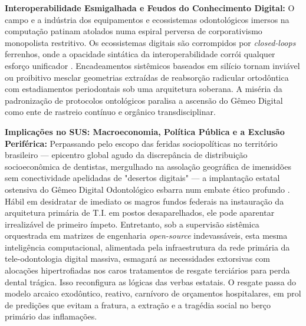 \textbf{Interoperabilidade Esmigalhada e Feudos do Conhecimento Digital:} O campo e a indústria dos equipamentos e ecossistemas odontológicos imersos na computação patinam atolados numa espiral perversa de corporativismo monopolista restritivo. Os ecossistemas digitais são corrompidos por \textit{closed-loops} ferrenhos, onde a opacidade sintática da interoperabilidade corrói qualquer esforço unificador \cite{robles2023opentwins}. Encadeamentos sistêmicos baseados em silício tornam inviável ou proibitivo mesclar geometrias extraídas de reabsorção radicular ortodôntica com estadiamentos periodontais sob uma arquitetura soberana. A miséria da padronização de protocolos ontológicos paralisa a ascensão do Gêmeo Digital como ente de rastreio contínuo e orgânico transdisciplinar. 


\textbf{Implicações no SUS: Macroeconomia, Política Pública e a Exclusão Periférica:} Perpassando pelo escopo das feridas sociopolíticas no território brasileiro --- epicentro global agudo da discrepância de distribuição socioeconômica de dentistas, mergulhado na assolação geográfica de imensidões sem conectividade apelidadas de "desertos digitais" \cite{cuadros2023assessing} --- a implantação estatal ostensiva do Gêmeo Digital Odontológico esbarra num embate ético profundo \cite{frota2025sus}. Hábil em desidratar de imediato os magros fundos federais na instauração da arquitetura primária de T.I. em postos desaparelhados, ele pode aparentar irrealizável de primeiro ímpeto. Entretanto, sob a supervisão sistêmica orquestrada em matrizes de engenharia \textit{open-source} indevassáveis, esta mesma inteligência computacional, alimentada pela infraestrutura da rede primária da tele-odontologia digital massiva, esmagará as necessidades extorsivas com alocações hipertrofiadas nos caros tratamentos de resgate terciários para perda dental trágica. Isso reconfigura as lógicas das verbas estatais. O resgate passa do modelo arcaico exodôntico, reativo, carnívoro de orçamentos hospitalares, em prol de predições que evitam a fratura, a extração e a tragédia social no berço primário das inflamações.


